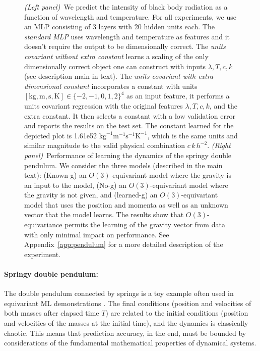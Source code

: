 \documentclass[accepted]{article}
\newcommand{\appref}[1]{Appendix~\ref{#1}}
\newcommand{\unit}[1]{\mathrm{#1}}
\newcommand{\kg}{\unit{kg}}
\newcommand{\m}{\unit{m}}
\newcommand{\s}{\unit{s}}
\newcommand{\K}{\unit{K}}
\begin{document}
\begin{figure}[t!]
    \caption{\textsl{(Left panel)}~We predict the intensity of black body radiation as a function of wavelength and temperature. For all experiments, we use an MLP consisting of 3 layers with 20 hidden units each. The \emph{standard MLP} uses wavelength and temperature as features and it doesn't require the output to be dimensionally correct. The \emph{units covariant without extra constant} learns a scaling of the only dimensionally correct object one can construct with inputs $\lambda, T, c, k$ (see description main in text). The \emph{units covariant with extra dimensional constant} incorporates a constant with units $[\kg, \m, \s, \K]\in\{-2,-1,0,1,2\}^4$ as an input feature, it performs a units covariant regression with the original features $\lambda, T, c, k$, and the extra constant. It then selects a constant with a low validation error and reports the results on the test set. The constant learned for the depicted plot is 1.61e52 $\kg^{-1}\m^{-1}\s^{-1}\K^{-1}$, which is the same units and similar magnitude to the valid physical combination $c\,k\,h^{-2}$. 
    \textsl{(Right panel)}~Performance of learning the dynamics of the springy double pendulum. We consider the three models (described in the main text): (Known-g) an $O(3)$-equivariant model where the gravity is an input to the model, (No-g) an $O(3)$-equivariant model where the gravity is not given, and (learned-g) an $O(3)$-equivariant model that uses the position and momenta as well as an unknown vector that the model learns. The results show that $O(3)$-equivariance permits the learning of the gravity vector from data with only minimal impact on performance. See \appref{app:pendulum} for a more detailed description of the experiment.}
    \label{fig:exps}
\end{figure}

\paragraph{Springy double pendulum:}
The double pendulum connected by springs is a toy example often used in equivariant ML demonstrations \citep{finzi2021practical,yao2021simple, villar2022dimensionless}. 
The final conditions (position and velocities of both masses after elapsed time $T$) are related to the initial conditions (position and velocities of the masses at the initial time), and the dynamics is classically chaotic.
This means that prediction accuracy, in the end, must be bounded by considerations of the fundamental mathematical properties of dynamical systems.
\end{document}
